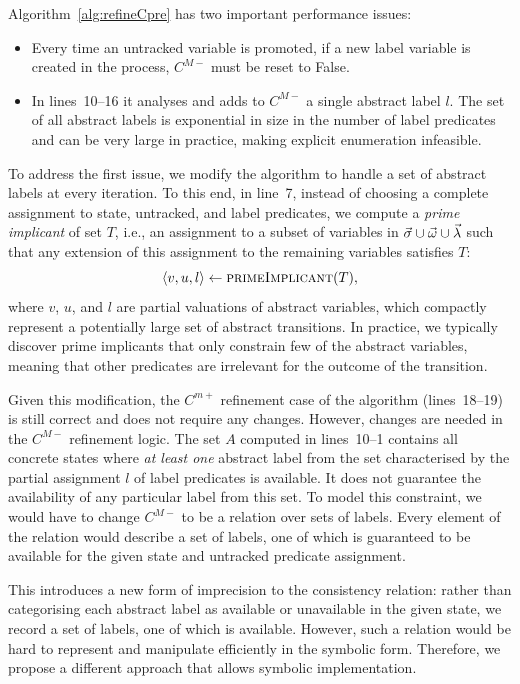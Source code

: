 Algorithm~\ref{alg:refineCpre} has two important performance issues: 

\begin{itemize}

    \item Every time an untracked variable is promoted, if a new label variable is created in the process, $C^{M-}$ must be reset to False.

    \item In lines~10--16 it analyses and adds to $C^{M-}$ a single abstract label $l$.  The set of all abstract labels is exponential in size in the number of label predicates and can be very large in practice, making explicit enumeration infeasible.  

\end{itemize}

To address the first issue, we modify the algorithm to handle a set of abstract labels at every iteration.  To this end, in line~7, instead of choosing a complete assignment to state, untracked, and label predicates, we compute a \emph{prime implicant} of set $T$, i.e., an assignment to a subset of variables in $\vec{\sigma}\cup\vec{\omega}\cup\vec{\lambda}$ such that any extension of this assignment to the remaining variables satisfies $T$: 
$$
\langle v,u,l\rangle \gets \textsc{primeImplicant}(T),
$$ 
where $v$, $u$, and $l$ are partial valuations of abstract variables, which compactly represent a potentially large set of abstract transitions.  In practice, we typically discover prime implicants that only constrain few of the abstract variables, meaning that other predicates are irrelevant for the outcome of the transition.  

Given this modification, the $C^{m+}$ refinement case of the algorithm (lines~18--19) is still correct and does not require any changes.  However, changes are needed in the $C^{M-}$ refinement logic.  The set $A$ computed in lines~10--1 contains all concrete states where \emph{at least one} abstract label from the set characterised by the partial assignment $l$ of label predicates is available.  It does not guarantee the availability of any particular label from this set.  To model this constraint, we would have to change $C^{M-}$ to be a relation over sets of labels.  Every element of the relation would describe a set of labels, one of which is guaranteed to be available for the given state and untracked predicate assignment.  

This introduces a new form of imprecision to the consistency relation: rather than categorising each abstract label as available or unavailable in the given state, we record a set of labels, one of which is available.  However, such a relation would be hard to represent and manipulate efficiently in the symbolic form.  Therefore, we propose a different approach that allows symbolic implementation.  

